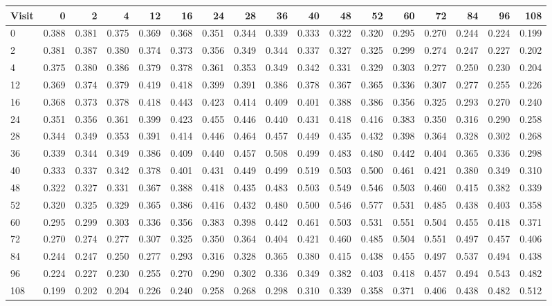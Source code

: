 \small
\begin{tabular}{lrrrrrrrrrrrrrrrr}
\hline
Visit & 0 & 2 & 4 & 12 & 16 & 24 & 28 & 36 & 40 & 48 & 52 & 60 & 72 & 84 & 96 & 108 \\
\hline
0 & 0.388 & 0.381 & 0.375 & 0.369 & 0.368 & 0.351 & 0.344 & 0.339 & 0.333 & 0.322 & 0.320 & 0.295 & 0.270 & 0.244 & 0.224 & 0.199 \\
2 & 0.381 & 0.387 & 0.380 & 0.374 & 0.373 & 0.356 & 0.349 & 0.344 & 0.337 & 0.327 & 0.325 & 0.299 & 0.274 & 0.247 & 0.227 & 0.202 \\
4 & 0.375 & 0.380 & 0.386 & 0.379 & 0.378 & 0.361 & 0.353 & 0.349 & 0.342 & 0.331 & 0.329 & 0.303 & 0.277 & 0.250 & 0.230 & 0.204 \\
12 & 0.369 & 0.374 & 0.379 & 0.419 & 0.418 & 0.399 & 0.391 & 0.386 & 0.378 & 0.367 & 0.365 & 0.336 & 0.307 & 0.277 & 0.255 & 0.226 \\
16 & 0.368 & 0.373 & 0.378 & 0.418 & 0.443 & 0.423 & 0.414 & 0.409 & 0.401 & 0.388 & 0.386 & 0.356 & 0.325 & 0.293 & 0.270 & 0.240 \\
24 & 0.351 & 0.356 & 0.361 & 0.399 & 0.423 & 0.455 & 0.446 & 0.440 & 0.431 & 0.418 & 0.416 & 0.383 & 0.350 & 0.316 & 0.290 & 0.258 \\
28 & 0.344 & 0.349 & 0.353 & 0.391 & 0.414 & 0.446 & 0.464 & 0.457 & 0.449 & 0.435 & 0.432 & 0.398 & 0.364 & 0.328 & 0.302 & 0.268 \\
36 & 0.339 & 0.344 & 0.349 & 0.386 & 0.409 & 0.440 & 0.457 & 0.508 & 0.499 & 0.483 & 0.480 & 0.442 & 0.404 & 0.365 & 0.336 & 0.298 \\
40 & 0.333 & 0.337 & 0.342 & 0.378 & 0.401 & 0.431 & 0.449 & 0.499 & 0.519 & 0.503 & 0.500 & 0.461 & 0.421 & 0.380 & 0.349 & 0.310 \\
48 & 0.322 & 0.327 & 0.331 & 0.367 & 0.388 & 0.418 & 0.435 & 0.483 & 0.503 & 0.549 & 0.546 & 0.503 & 0.460 & 0.415 & 0.382 & 0.339 \\
52 & 0.320 & 0.325 & 0.329 & 0.365 & 0.386 & 0.416 & 0.432 & 0.480 & 0.500 & 0.546 & 0.577 & 0.531 & 0.485 & 0.438 & 0.403 & 0.358 \\
60 & 0.295 & 0.299 & 0.303 & 0.336 & 0.356 & 0.383 & 0.398 & 0.442 & 0.461 & 0.503 & 0.531 & 0.551 & 0.504 & 0.455 & 0.418 & 0.371 \\
72 & 0.270 & 0.274 & 0.277 & 0.307 & 0.325 & 0.350 & 0.364 & 0.404 & 0.421 & 0.460 & 0.485 & 0.504 & 0.551 & 0.497 & 0.457 & 0.406 \\
84 & 0.244 & 0.247 & 0.250 & 0.277 & 0.293 & 0.316 & 0.328 & 0.365 & 0.380 & 0.415 & 0.438 & 0.455 & 0.497 & 0.537 & 0.494 & 0.438 \\
96 & 0.224 & 0.227 & 0.230 & 0.255 & 0.270 & 0.290 & 0.302 & 0.336 & 0.349 & 0.382 & 0.403 & 0.418 & 0.457 & 0.494 & 0.543 & 0.482 \\
108 & 0.199 & 0.202 & 0.204 & 0.226 & 0.240 & 0.258 & 0.268 & 0.298 & 0.310 & 0.339 & 0.358 & 0.371 & 0.406 & 0.438 & 0.482 & 0.512 \\
\hline
\end{tabular}
